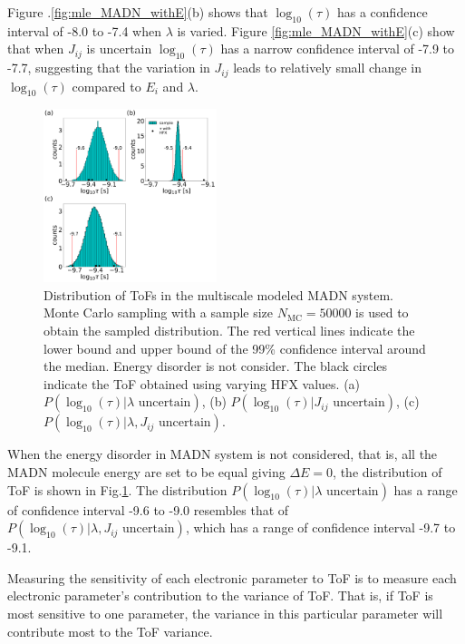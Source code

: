 \documentclass[%
 reprint,
 amsmath,amssymb,
 aps,
]{revtex4-2}
\begin{document}
Figure .\ref{fig:mle_MADN_withE}(b) shows that $\log_{10}(\tau)$ has a confidence interval of -8.0 to -7.4 when $\lambda$ is varied. 
Figure \ref{fig:mle_MADN_withE}(c) show that when $J_{ij}$ is uncertain $\log_{10}(\tau)$ has a narrow confidence interval of -7.9 to -7.7, suggesting that the variation in $J_{ij}$ leads to relatively small change in $\log_{10}(\tau)$ compared to $E_i$ and $\lambda$.

%
\begin{figure}[H]
  \centering
  \includegraphics[width=0.45\textwidth]{figs/fig_mle_MADN_noE.pdf}
  \caption{Distribution of ToFs in the multiscale modeled MADN system.
  Monte Carlo sampling with a sample size $N_\text{MC}=50000$ is used to obtain the sampled distribution. The red vertical lines indicate the lower bound and upper bound of the 99\% confidence interval around the median.
  Energy disorder is not consider. 
  The black circles indicate the ToF obtained using varying HFX values.
  (a) $P(\log_{10}(\tau)|\lambda \text{ uncertain})$, 
  (b) $P(\log_{10}(\tau)|J_{ij} \text{ uncertain})$, 
  (c) $P(\log_{10}(\tau)|\lambda, J_{ij} \text{ uncertain})$. }
  \label{fig:mle_MADN_noE}
\end{figure}
%

When the energy disorder in MADN system is not considered, that is, all the MADN molecule energy are set to be equal giving $\Delta E=0$, the distribution of ToF is shown in Fig.\ref{fig:mle_MADN_noE}. 
The distribution $P(\log_{10}(\tau)|\lambda \text{ uncertain})$ has a range of confidence interval -9.6 to -9.0 resembles that of $P(\log_{10}(\tau)|\lambda, J_{ij} \text{ uncertain})$, which has a range of confidence interval -9.7 to -9.1. 

Measuring the sensitivity of each electronic parameter to ToF is to measure each electronic parameter's contribution to the variance of ToF. 
That is, if ToF is most sensitive to one parameter, the variance in this particular parameter will contribute most to the ToF variance. 
\end{document}
